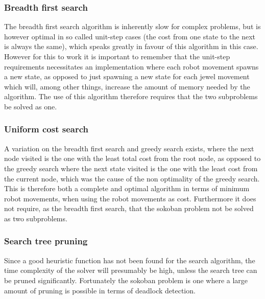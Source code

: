\subsubsection*{Breadth first search}
The breadth first search algorithm is inherently slow for complex problems, but is however optimal in so called unit-step cases (the cost from one state to the next is always the same), which speaks greatly in favour of this algorithm in this case. However for this to work it is important to remember that the unit-step requirements necessitates an implementation where each robot movement spawns a new state, as opposed to just spawning a new state for each jewel movement which will, among other things, increase the amount of memory needed by the algorithm. The use of this algorithm therefore requires that the two subproblems be solved as one.

\subsubsection*{Uniform cost search}
A variation on the breadth first search and greedy search exists, where the next node visited is the one with the least total cost from the root node, as opposed to the greedy search where the next state visited is the one with the least cost from the current node, which was the cause of the non optimality of the greedy search. This is therefore both a complete and optimal algorithm in terms of minimum robot movements, when using the robot movements as cost. Furthermore it does not require, as the breadth first search, that the sokoban problem not be solved as two subproblems.

\subsubsection*{Search tree pruning}
Since a good heuristic function has not been found for the search algorithm, the time complexity of the solver will presumably be high, unless the search tree can be pruned significantly. Fortunately the sokoban problem is one where a large amount of pruning is possible in terms of deadlock detection. 

